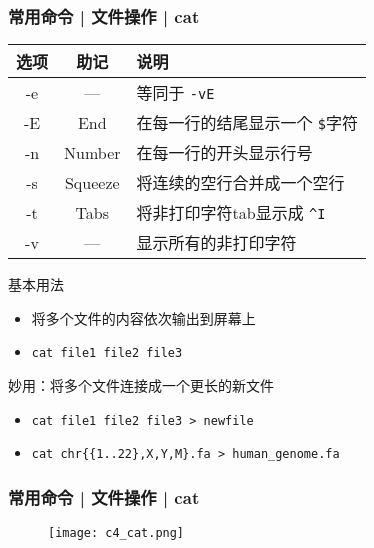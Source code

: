 \begin{frame}[fragile]
  \frametitle{常用命令 | 文件操作 | cat}
  \begin{table}
    \centering
    \begin{tabularx}{0.9\textwidth}{ccX}
      \hline
      \rowcolor{blue!50}选项 & 助记 & 说明\\
      \hline
      -e & --- & 等同于 \verb|-vE|\\
      -E & End & 在每一行的结尾显示一个 \verb|$|字符\\
      -n & Number & 在每一行的开头显示行号\\
      -s & Squeeze & 将连续的空行合并成一个空行\\
      -t & Tabs & 将非打印字符tab显示成 \verb|^I|\\
      -v & --- & 显示所有的非打印字符\\
      \hline
    \end{tabularx}
  \end{table}
  \vspace{-0.5em}
  \pause
  \begin{block}{基本用法}
    \begin{itemize}
      \item 将多个文件的内容依次输出到屏幕上
      \item \verb|cat file1 file2 file3|
    \end{itemize}
  \end{block}
  \vspace{-0.5em}
  \pause
  \begin{block}{\alert{妙用：将多个文件连接成一个更长的新文件}}
    \begin{itemize}
      \item \verb|cat file1 file2 file3 > newfile|
      \item \verb|cat chr{{1..22},X,Y,M}.fa > human_genome.fa|
    \end{itemize}
  \end{block}
\end{frame}

\begin{frame}[fragile]
  \frametitle{常用命令 | 文件操作 | cat}
  \begin{figure}
    \centering
    \texttt{[image: c4\_cat.png]}
  \end{figure}
\end{frame}

